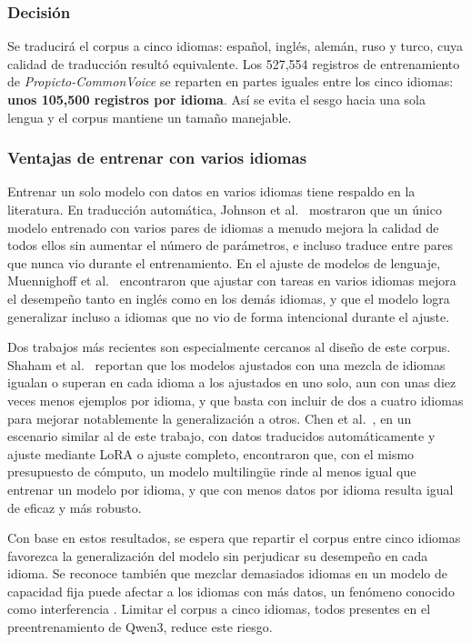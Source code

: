 \subsubsection{Decisión}
Se traducirá el corpus a cinco idiomas: español, inglés, alemán, ruso y turco, cuya calidad de traducción resultó equivalente. Los 527,554 registros de entrenamiento de \textit{Propicto-CommonVoice} se reparten en partes iguales entre los cinco idiomas: \textbf{unos 105,500 registros por idioma}. Así se evita el sesgo hacia una sola lengua y el corpus mantiene un tamaño manejable.

\subsubsection{Ventajas de entrenar con varios idiomas}
Entrenar un solo modelo con datos en varios idiomas tiene respaldo en la literatura. En traducción automática, Johnson et al.\ \cite{johnson2017google} mostraron que un único modelo entrenado con varios pares de idiomas a menudo mejora la calidad de todos ellos sin aumentar el número de parámetros, e incluso traduce entre pares que nunca vio durante el entrenamiento. En el ajuste de modelos de lenguaje, Muennighoff et al.\ \cite{muennighoff2022crosslingual} encontraron que ajustar con tareas en varios idiomas mejora el desempeño tanto en inglés como en los demás idiomas, y que el modelo logra generalizar incluso a idiomas que no vio de forma intencional durante el ajuste.

Dos trabajos más recientes son especialmente cercanos al diseño de este corpus. Shaham et al.\ \cite{shaham2024multilingual} reportan que los modelos ajustados con una mezcla de idiomas igualan o superan en cada idioma a los ajustados en uno solo, aun con unas diez veces menos ejemplos por idioma, y que basta con incluir de dos a cuatro idiomas para mejorar notablemente la generalización a otros. Chen et al.\ \cite{chen2024monolingual}, en un escenario similar al de este trabajo, con datos traducidos automáticamente y ajuste mediante LoRA o ajuste completo, encontraron que, con el mismo presupuesto de cómputo, un modelo multilingüe rinde al menos igual que entrenar un modelo por idioma, y que con menos datos por idioma resulta igual de eficaz y más robusto.

Con base en estos resultados, se espera que repartir el corpus entre cinco idiomas favorezca la generalización del modelo sin perjudicar su desempeño en cada idioma. Se reconoce también que mezclar demasiados idiomas en un modelo de capacidad fija puede afectar a los idiomas con más datos, un fenómeno conocido como interferencia \cite{aharoni2019massively, conneau2020unsupervised}. Limitar el corpus a cinco idiomas, todos presentes en el preentrenamiento de Qwen3, reduce este riesgo.

